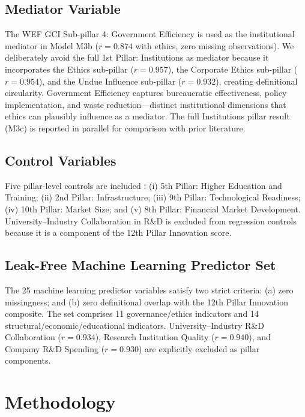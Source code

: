 \documentclass[pdflatex,sn-apa]{sn-jnl}
\begin{document}
\subsection{Mediator Variable}

The WEF GCI Sub-pillar 4: Government Efficiency is used as the institutional mediator in Model M3b ($r=0.874$ with ethics, zero missing observations). We deliberately avoid the full 1st Pillar: Institutions as mediator because it incorporates the Ethics sub-pillar ($r=0.957$), the Corporate Ethics sub-pillar ($r=0.954$), and the Undue Influence sub-pillar ($r=0.932$), creating definitional circularity. Government Efficiency captures bureaucratic effectiveness, policy implementation, and waste reduction---distinct institutional dimensions that ethics can plausibly influence as a mediator. The full Institutions pillar result (M3c) is reported in parallel for comparison with prior literature.

\subsection{Control Variables}

Five pillar-level controls are included \citep{porter1990,hall2010,oecd2015}: (i) 5th Pillar: Higher Education and Training; (ii) 2nd Pillar: Infrastructure; (iii) 9th Pillar: Technological Readiness; (iv) 10th Pillar: Market Size; and (v) 8th Pillar: Financial Market Development. University--Industry Collaboration in R\&D is excluded from regression controls because it is a component of the 12th Pillar Innovation score.

\subsection{Leak-Free Machine Learning Predictor Set}

The 25 machine learning predictor variables satisfy two strict criteria: (a) zero missingness; and (b) zero definitional overlap with the 12th Pillar Innovation composite. The set comprises 11 governance/ethics indicators and 14 structural/economic/educational indicators. University--Industry R\&D Collaboration ($r=0.934$), Research Institution Quality ($r=0.940$), and Company R\&D Spending ($r=0.930$) are explicitly excluded as pillar components.

\section{Methodology}
\label{sec:methodology}
\end{document}
